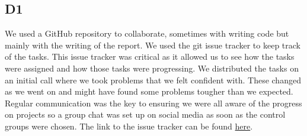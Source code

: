 \subsection*{D1}
    \hfill \break
    We used a GitHub repository to collaborate, sometimes with writing code but mainly with the writing of the report. We used the git issue tracker to keep track of the tasks. This issue tracker was critical as it allowed us to see how the tasks were assigned and how those tasks were progressing. We distributed the tasks on an initial call where we took problems that we felt confident with. These changed as we went on and might have found some problems tougher than we expected. Regular communication was the key to ensuring we were all aware of the progress on projects so a group chat was set up on social media as soon as the control groups were chosen. The link to the issue tracker can be found  \href{https://github.com/drlim2u/ELE2024-Control-Coursework/issues}{here}.